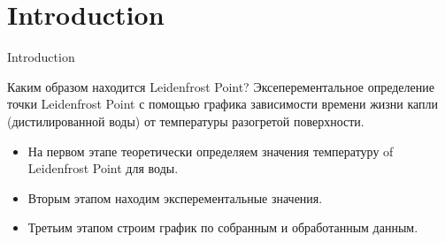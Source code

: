 \section{Introduction}
\begin{frame}{Introduction}
\vspace{0.25cm}
\begin{block}{Каким образом находится Leidenfrost Point?}
    Эксеперементальное определение точки Leidenfrost Point с помощью графика зависимости времени жизни капли
    (дистилированной воды) от температуры разогретой поверхности.
\end{block}
    \vspace{0.25cm}
\begin{itemize}
\item На первом этапе теоретически определяем значения температуру of Leidenfrost Point для воды.
\vspace{0.25cm}
\item Вторым этапом находим эксперементальные значения.
\vspace{0.25cm}
    \item Третьим этапом строим график по собранным и обработанным данным.
    \vspace{0.25cm}
\end{itemize}
\end{frame}